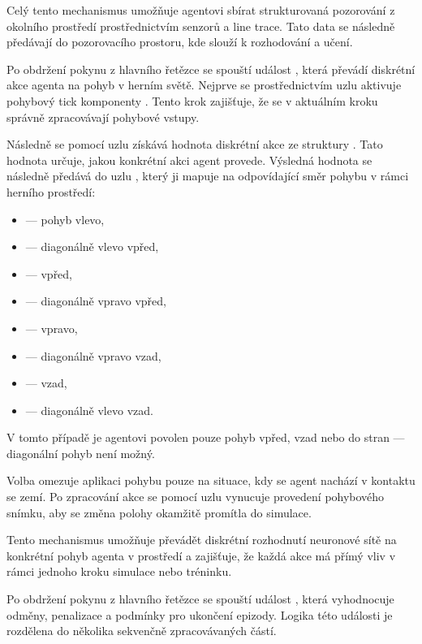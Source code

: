 Celý tento mechanismus umožňuje agentovi sbírat strukturovaná pozorování z okolního prostředí prostřednictvím senzorů a line trace. Tato data se následně předávají do pozorovacího prostoru, kde slouží k rozhodování a učení.

Po obdržení pokynu z hlavního řetězce se spouští událost , která převádí diskrétní akce agenta na pohyb v herním světě. Nejprve se prostřednictvím uzlu  aktivuje pohybový tick komponenty . Tento krok zajišťuje, že se v aktuálním kroku správně zpracovávají pohybové vstupy.

Následně se pomocí uzlu  získává hodnota diskrétní akce ze struktury . Tato hodnota určuje, jakou konkrétní akci agent provede. Výsledná hodnota se následně předává do uzlu , který ji mapuje na odpovídající směr pohybu v rámci herního prostředí:

\begin{itemize}
\item {} — pohyb vlevo,
\item {} — diagonálně vlevo vpřed,
\item {} — vpřed,
\item {} — diagonálně vpravo vpřed,
\item {} — vpravo,
\item {} — diagonálně vpravo vzad,
\item {} — vzad,
\item {} — diagonálně vlevo vzad.
\end{itemize}

V tomto případě je agentovi povolen pouze pohyb vpřed, vzad nebo do stran — diagonální pohyb není možný.

Volba  omezuje aplikaci pohybu pouze na situace, kdy se agent nachází v kontaktu se zemí. Po zpracování akce se pomocí uzlu  vynucuje provedení pohybového snímku, aby se změna polohy okamžitě promítla do simulace.

Tento mechanismus umožňuje převádět diskrétní rozhodnutí neuronové sítě na konkrétní pohyb agenta v prostředí a zajišťuje, že každá akce má přímý vliv v rámci jednoho kroku simulace nebo tréninku.

Po obdržení pokynu z hlavního řetězce se spouští událost , která vyhodnocuje odměny, penalizace a podmínky pro ukončení epizody. Logika této události je rozdělena do několika sekvenčně zpracovávaných částí.

